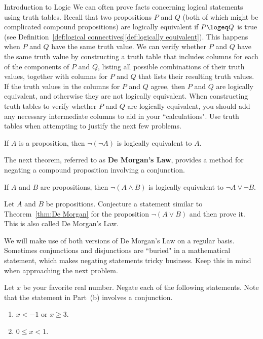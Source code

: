 \begin{section}{Introduction to Logic}
We can often prove facts concerning logical statements using truth tables.  Recall that two propositions $P$ and $Q$ (both of which might be complicated compound propositions) are logically equivalent if $P\logeq Q$ is true (see Definition~\ref{def:logical connectives}\ref{def:logically equivalent}). This happens when $P$ and $Q$ have the same truth value. We can verify whether $P$ and $Q$ have the same truth value by constructing a truth table that includes columns for each of the components of $P$ and $Q$, listing all possible combinations of their truth values, together with columns for $P$ and $Q$ that lists their resulting truth values.  If the truth values in the columns for $P$ and $Q$ agree, then $P$ and $Q$ are logically equivalent, and otherwise they are not logically equivalent.  When constructing truth tables to verify whether $P$ and $Q$ are logically equivalent, you should add any necessary intermediate columns to aid in your ``calculations". Use truth tables when attempting to justify the next few problems.

\begin{theorem}
If $A$ is a proposition, then $\neg(\neg A)$ is logically equivalent to $A$.
\end{theorem}

The next theorem, referred to as \textbf{De Morgan's Law}, provides a method for negating a compound proposition involving a conjunction.

\begin{theorem}\label{thm:De Morgan}
If $A$ and $B$ are propositions, then $\neg(A \wedge B)$ is logically equivalent to $\neg A \vee \neg B$.
\end{theorem}

\begin{problem}\label{prob:De Morgan}
Let $A$ and $B$ be propositions.  Conjecture a statement similar to Theorem~\ref{thm:De Morgan} for the proposition $\neg(A\vee B)$ and then prove it. This is also called De Morgan's Law.
\end{problem}

We will make use of both versions of De Morgan's Law on a regular basis. Sometimes conjunctions and disjunctions are ``buried" in a mathematical statement, which makes negating statements tricky business. Keep this in mind when approaching the next problem.

\begin{problem}\label{prob:negation}
Let $x$ be your favorite real number.  Negate each of the following statements.  Note that the statement in Part~(b) involves a conjunction.
\begin{enumerate}[label=\textrm{(\alph*)}]
\item $x<-1$ or $x\geq 3$.
\item $0\leq x< 1$.
\end{enumerate}
\end{problem}


\end{section}
